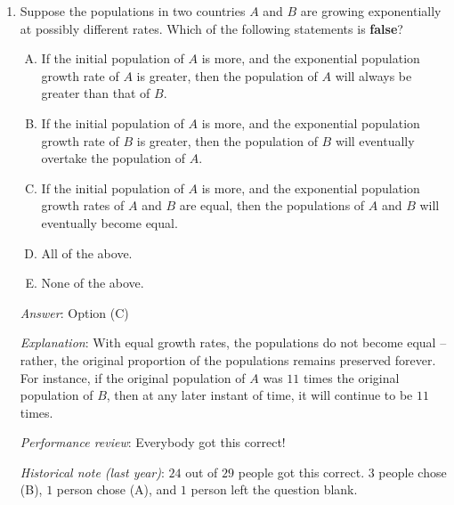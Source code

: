 \documentclass[10pt]{amsart}
\begin{document}
\begin{enumerate}
  {\em Explanation}: Since the species doubles in number every hour,
  it must have doubled in the last hour. Thus, at the beginning of the
  last hour, it must have occupied half the petri dish volume. This is
  $8$ hours from the beginning, since $9 - 1 = 8$.

  {\em Performance review}: $9$ out of $12$ got this correct. $2$
  chose (B), $1$ chose (C).

  {\em Historical note (last year)}: $28$ out of $29$ people got this
  correct. $1$ person chose (C).

  {\em Note}: This is a standard trick/conceptual question. Variants
  of this are used to test people's ``intuitive'' understanding of
  exponential growth.

\item Suppose the populations in two countries $A$ and $B$ are growing
  exponentially at possibly different rates. Which of the following
  statements is {\bf false}?

  \begin{enumerate}[(A)]
  \item If the initial population of $A$ is more, and the exponential
    population growth rate of $A$ is greater, then the population of
    $A$ will always be greater than that of $B$.
  \item If the initial population of $A$ is more, and the exponential
    population growth rate of $B$ is greater, then the population of
    $B$ will eventually overtake the population of $A$.
  \item If the initial population of $A$ is more, and the exponential
    population growth rates of $A$ and $B$ are equal, then the
    populations of $A$ and $B$ will eventually become equal.
  \item All of the above.
  \item None of the above.
  \end{enumerate}

  {\em Answer}: Option (C)

  {\em Explanation}: With equal growth rates, the populations do not
  become equal -- rather, the original proportion of the populations
  remains preserved forever. For instance, if the original population
  of $A$ was $11$ times the original population of $B$, then at any
  later instant of time, it will continue to be $11$ times.

  {\em Performance review}: Everybody got this correct!

  {\em Historical note (last year)}: $24$ out of $29$ people got this
  correct. $3$ people chose (B), $1$ person chose (A), and $1$ person
  left the question blank.


\end{enumerate}
\end{document}
